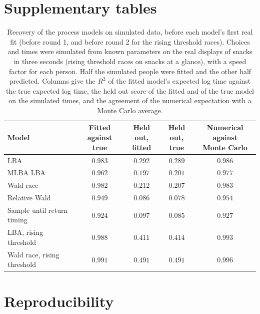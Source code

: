 \documentclass[11pt]{article}
\newcommand{\Rtwo}{R^2}
\begin{document}



\appendix
\section{Supplementary tables}

\begin{table}[h]
\centering
\footnotesize
\caption{Recovery of the process models on simulated data, before each model's first real fit (before round 1, and before round 2 for the rising threshold races). Choices and times were simulated from known parameters on the real displays of snacks in three seconds (rising threshold races on snacks at a glance), with a speed factor for each person. Half the simulated people were fitted and the other half predicted. Columns give the $\Rtwo$ of the fitted model's expected log time against the true expected log time, the held out score of the fitted and of the true model on the simulated times, and the agreement of the numerical expectation with a Monte Carlo average.}
\label{tab:sim}
\begin{tabular}{lcccc}
\toprule
Model & \makecell{Fitted against\\true} & \makecell{Held out,\\fitted} & \makecell{Held out,\\true} & \makecell{Numerical against\\Monte Carlo} \\
\midrule
LBA & $0.983$ & $0.292$ & $0.289$ & $0.986$ \\
MLBA LBA & $0.962$ & $0.197$ & $0.201$ & $0.977$ \\
Wald race & $0.982$ & $0.212$ & $0.207$ & $0.983$ \\
Relative Wald & $0.949$ & $0.086$ & $0.078$ & $0.954$ \\
Sample until return timing & $0.924$ & $0.097$ & $0.085$ & $0.927$ \\
LBA, rising threshold & $0.988$ & $0.411$ & $0.414$ & $0.993$ \\
Wald race, rising threshold & $0.991$ & $0.491$ & $0.491$ & $0.996$ \\
\bottomrule
\end{tabular}
\end{table}




\FloatBarrier
\section{Reproducibility}
\end{document}
